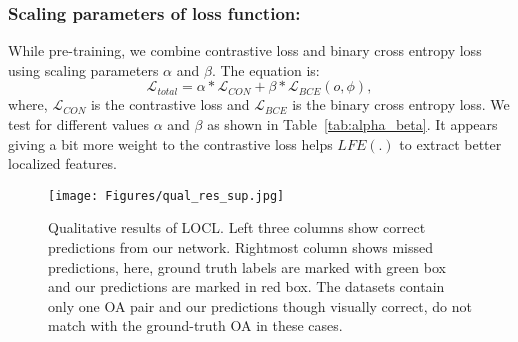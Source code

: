 \documentclass{bmvc2k}
\begin{document}
\subsubsection{Scaling parameters of loss function:} While pre-training, we combine contrastive loss and binary cross entropy loss using scaling parameters $\alpha$ and $\beta$. The equation is:
\begin{equation}
    \mathcal{L}_{total} = \alpha * \mathcal{L}_{CON} + \beta * \mathcal{L}_{BCE}(o, \phi),
    \label{eq:loss_cl}
\end{equation}
where, $\mathcal{L}_{CON}$ is the contrastive loss and $\mathcal{L}_{BCE}$ is the binary cross entropy loss. We test for different values $\alpha$ and $\beta$ as shown in Table~\ref{tab:alpha_beta}. It appears giving a bit more weight to the contrastive loss helps $LFE(.)$ to extract better localized features. 

\begin{figure*}[]
    \texttt{[image: Figures/qual\_res\_sup.jpg]}
    \caption{Qualitative results of LOCL. Left three columns show correct predictions from our network. Rightmost column shows missed predictions, here, ground truth labels are marked with green box and our predictions are marked in red box. The datasets contain only one OA pair and our predictions though visually correct, do not match with the ground-truth OA in these cases.}
    \label{fig:Qual-Results-sup}
\end{figure*}
\end{document}
